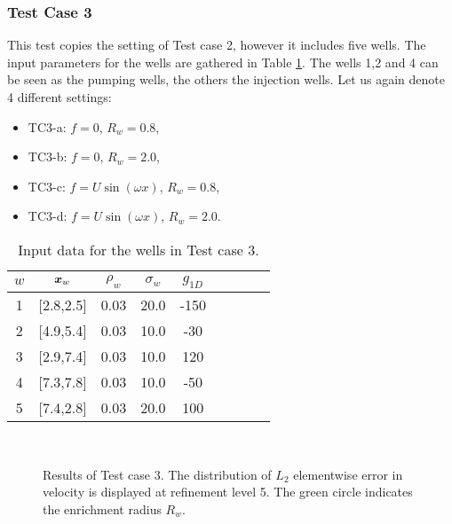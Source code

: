 


\subsubsection{Test Case 3}
This test copies the setting of Test case 2, however it includes five wells.
The input parameters for the wells are gathered in Table \ref{tab:tc3_data}.
The wells 1,2 and 4 can be seen as the pumping wells, the others the injection wells.
Let us again denote 4 different settings:
\begin{itemize}
    \item TC3-a: $f=0$, $R_w=0.8$,
    \item TC3-b: $f=0$, $R_w=2.0$,
    \item TC3-c: $f=U\sin(\omega x)$, $R_w=0.8$,
    \item TC3-d: $f=U\sin(\omega x)$, $R_w=2.0$.
\end{itemize}
%
\begin{table}[!htb]
\begin{center}
\begin{tabular}{ccccccccc}
\toprule
$w$ & $\mathbf{\boldsymbol{x}}_w$  & $\rho_w$ & $\sigma_w$ & $g_{1D}$\\
\midrule
1& [2.8,2.5] & 0.03 & 20.0 & -150 \\
2& [4.9,5.4] & 0.03 & 10.0 & -30 \\
3& [2.9,7.4] & 0.03 & 10.0 & 120 \\
4& [7.3,7.8] & 0.03 & 10.0 & -50 \\
5& [7.4,2.8] & 0.03 & 20.0 & 100 \\
\bottomrule
\end{tabular}
\caption{Input data for the wells in Test case 3.}
\label{tab:tc3_data}
\end{center}
\end{table}
%
\begin{figure}[!htb]
    \centering
     \\
    \caption
    {Results of Test case 3. The distribution of $L_2$ elementwise error in velocity is displayed at refinement level 5.
    The green circle indicates the enrichment radius $R_w$. }
    \label{fig:mh_tc3_error}
\end{figure}
%

